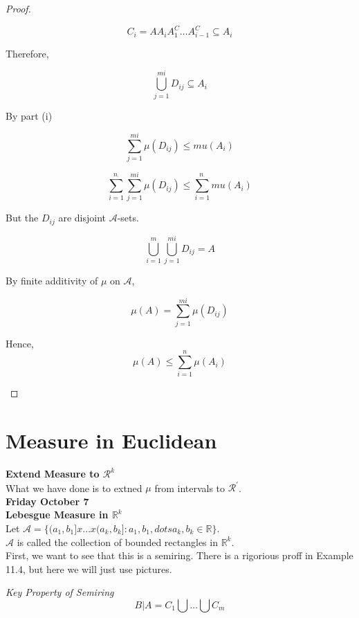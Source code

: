 \documentclass[11pt,fleqn]{book} %
\begin{document}
\begin{proof}
\begin{enumerate}
			$$ C_i = A A_i A_1^C \dots A^C_{i-1} \subseteq A_i $$

	Therefore, 

			$$ \bigcup^{mi}_{j=1} D_{ij} \subseteq A_i$$	

	By part (i)

			$$\sum^{mi}_{j=1} \mu(D_{ij}) \leq mu(A_i) $$


			$$ \sum^{n_\cdot}_{i=1} \sum^{mi}_{j=1} \mu(D_{ij}) \leq \sum^{n_\cdot}_{i=1} mu(A_i)$$

	But the $D_{ij}$ are disjoint $\mathcal{A}$-sets. 

			$$ \bigcup^{m}_{i=1} \bigcup^{mi}_{j=1} D_{ij} = A$$

			$$ $$By finite additivity of $\mu$ on $\mathcal{A}$, 

					$$\mu(A) = \sum^{mi}_{j=1} \mu(D_{ij}) $$

	Hence, 
			$$ \mu(A) \leq \sum^n_{i=1} \mu(A_i) $$

	\end{enumerate}
\end{proof}


\section{Measure in Euclidean}


\textbf{Extend Measure to $\mathcal{R}^k$}\\

What we have done is to extned $\mu$ from intervals to $\mathcal{R}^\prime$.\\




\textbf{Friday October 7}\\


\textbf{Lebesgue Measure in $\mathbb{R}^k$}\\

Let $\mathcal{A} = \{(a_1, b_1]x \dots x (a_k, b_k] : a_1, b_1, dots a_k, b_k \in \mathbb{R}\}$. \\

$\mathcal{A}$ is called the collection of bounded rectangles in $\mathbb{R}^k$.\\

First, we want to see that this is a semiring. There is a rigorious proff in Example 11.4, but here we will just use pictures. 

\textit{Key Property of Semiring}\\ 


		$$B|A = C_1 \bigcup \dots \bigcup C_m $$
\end{document}
